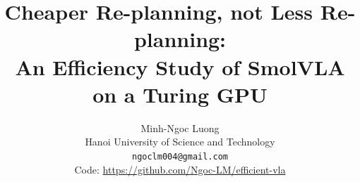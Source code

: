\documentclass[10pt,twocolumn,letterpaper]{article}
\title{Cheaper Re-planning, not Less Re-planning:\\An Efficiency Study of SmolVLA on a Turing GPU}
\author{Minh-Ngoc Luong\\
Hanoi University of Science and Technology\\
{\tt\small ngoclm004@gmail.com}\\
{\small Code: \url{https://github.com/Ngoc-LM/efficient-vla}}}
\begin{document}
\maketitle







{
    \footnotesize
    
    
}
\end{document}
